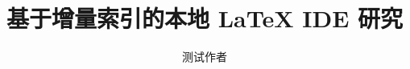 \documentclass[UTF8]{ctexbook}
\begin{document}
\title{基于增量索引的本地 LaTeX IDE 研究}
\author{测试作者}
\maketitle




\printbibliography
\end{document}
